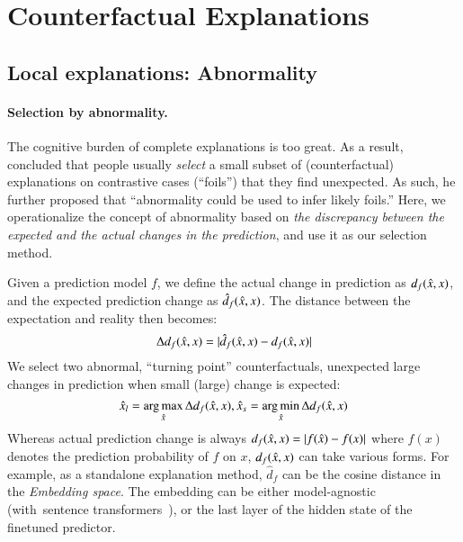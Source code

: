 
\newcommand{\fwone}[1]{\colbox{cfwone}{#1}\xspace}
\newcommand{\fwtwo}[1]{\colbox{cfwtwo}{#1}\xspace}
\newcommand{\fwthree}[1]{\colbox{cfwthree}{#1}\xspace}
\newcommand{\fwfour}[1]{\colbox{cfwfour}{#1}\xspace}

\newcommand{\fexp}[2]{\texttt{[{\color{darkgray}{#1:#2}}]}\xspace}
\newcommand{\fexptag}[1]{\fexp{TAG}{#1}}
\newcommand{\fexpfrom}[1]{\fexp{FROM}{#1}}
\newcommand{\fexpto}[1]{\fexp{TO}{#1}}
\newcommand{\fexptemp}[1]{\fexp{TEMP}{#1}}


\section{Counterfactual Explanations}


\subsection{Local explanations: Abnormality}


\paragraph{Selection by abnormality.}
The cognitive burden of complete explanations is too great.
As a result, \citet{miller} concluded that people usually \emph{select} a small subset of (counterfactual) explanations on contrastive cases (``foils'') that they find unexpected. 
As such, he further proposed that ``abnormality could be used to infer likely foils.''
Here, we operationalize the concept of abnormality based on \emph{the discrepancy between the expected and the actual changes in the prediction}, and use it as our selection method.

Given a prediction model $f$, we define the actual change in prediction as $d_f(\hat{x}, x)$, and the expected prediction change as $\hat{d}_f(\hat{x}, x)$.
The distance between the expectation and reality then becomes:
$$\Delta d_f(\hat{x}, x) = |\hat{d}_f(\hat{x}, x)-d_f(\hat{x}, x)|$$
We select two abnormal, ``turning point'' counterfactuals, \ie unexpected large changes in prediction when small (large) change is expected:
$$ \hat{x}_l = \operatorname*{arg\,max}_{\hat{x}} \Delta d_f(\hat{x}, x), \hat{x}_s = \operatorname*{arg\,min}_{\hat{x}} \Delta d_f(\hat{x}, x)$$
Whereas actual prediction change is always $d_f(\hat{x}, x)=|f(\hat{x})-f(x)|$ where $f(x)$ denotes the prediction probability of $f$ on $x$, $d_f(\hat{x}, x)$ can take various forms. 
For example, as a standalone explanation method, $\hat{d}_f$ can be the cosine distance in the \emph{Embedding space}.
The embedding can be either model-agnostic (\eg with~sentence transformers~\cite{reimers-2019-sentence-bert}), or the last layer of the hidden state of the finetuned predictor.

